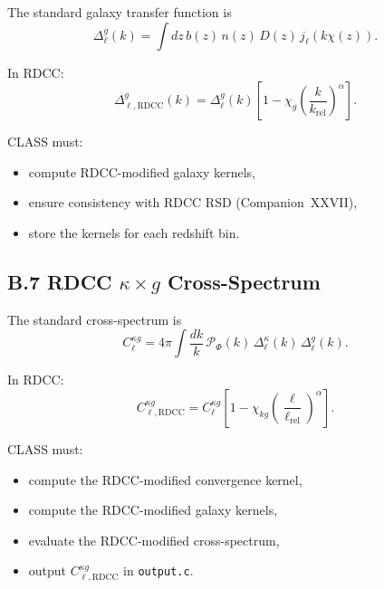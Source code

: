 \documentclass[11pt,a4paper]{article}
\begin{document}
The standard galaxy transfer function is
\begin{equation}
    \Delta_{\ell}^{g}(k)
    = \int dz\,
      b(z)\,n(z)\,D(z)\,
      j_{\ell}(k\chi(z)).
\end{equation}

In RDCC:
\begin{equation}
    \Delta_{\ell,\mathrm{RDCC}}^{g}(k)
    = \Delta_{\ell}^{g}(k)
      \left[
        1 - \chi_{g}
        \left(\frac{k}{k_{\mathrm{rel}}}\right)^{\alpha}
      \right].
\end{equation}

CLASS must:

\begin{itemize}
    \item compute RDCC-modified galaxy kernels,
    \item ensure consistency with RDCC RSD (Companion~XXVII),
    \item store the kernels for each redshift bin.
\end{itemize}

\subsection*{B.7 RDCC \texorpdfstring{$\kappa\times g$}{κ×g} Cross-Spectrum}

The standard cross-spectrum is
\begin{equation}
    C_{\ell}^{\kappa g}
    = 4\pi \int \frac{dk}{k}\,
      \mathcal{P}_{\Phi}(k)\,
      \Delta_{\ell}^{\kappa}(k)\,
      \Delta_{\ell}^{g}(k).
\end{equation}

In RDCC:
\begin{equation}
    C_{\ell,\mathrm{RDCC}}^{\kappa g}
    = C_{\ell}^{\kappa g}
      \left[
        1 - \chi_{kg}
        \left(\frac{\ell}{\ell_{\mathrm{rel}}}\right)^{\alpha}
      \right].
\end{equation}

CLASS must:

\begin{itemize}
    \item compute the RDCC-modified convergence kernel,
    \item compute the RDCC-modified galaxy kernels,
    \item evaluate the RDCC-modified cross-spectrum,
    \item output $C_{\ell,\mathrm{RDCC}}^{\kappa g}$ in \texttt{output.c}.
\end{itemize}
\end{document}
